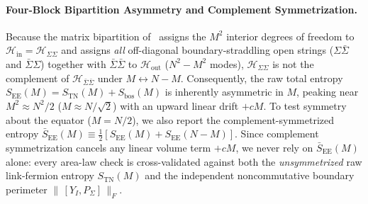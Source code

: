 \documentclass[11pt,a4paper]{article}
\begin{document}
\paragraph{Four-Block Bipartition Asymmetry and Complement Symmetrization.}
Because the matrix bipartition of~\cite{Fliss2025} assigns the $M^2$ interior degrees of freedom to $\mathcal{H}_{\mathrm{in}} = \mathcal{H}_{\Sigma\Sigma}$ and assigns \emph{all} off-diagonal boundary-straddling open strings ($\Sigma\bar{\Sigma}$ and $\bar{\Sigma}\Sigma$) together with $\bar{\Sigma}\bar{\Sigma}$ to $\mathcal{H}_{\mathrm{out}}$ ($N^2 - M^2$ modes), $\mathcal{H}_{\Sigma\Sigma}$ is not the complement of $\mathcal{H}_{\bar{\Sigma}\bar{\Sigma}}$ under $M \leftrightarrow N-M$. Consequently, the raw total entropy $S_{\mathrm{EE}}(M) = S_{\mathrm{TN}}(M) + S_{\mathrm{bos}}(M)$ is inherently asymmetric in $M$, peaking near $M^2 \approx N^2/2$ ($M \approx N/\sqrt{2}$) with an upward linear drift $+cM$. To test symmetry about the equator ($M = N/2$), we also report the complement-symmetrized entropy $\bar{S}_{\mathrm{EE}}(M) \equiv \frac{1}{2}[S_{\mathrm{EE}}(M) + S_{\mathrm{EE}}(N-M)]$. Since complement symmetrization cancels any linear volume term $+cM$, we never rely on $\bar{S}_{\mathrm{EE}}(M)$ alone: every area-law check is cross-validated against both the \emph{unsymmetrized} raw link-fermion entropy $S_{\mathrm{TN}}(M)$ and the independent noncommutative boundary perimeter $\|\,[Y_I, P_\Sigma]\,\|_F$.
\end{document}
